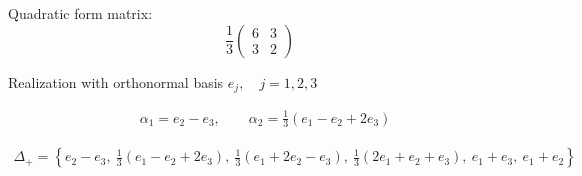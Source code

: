 \documentclass[12pt]{article}
\begin{document}
Quadratic form matrix:
\[\frac{1}{3}
\left(
\begin{array}{cc}
 6& 3 \\
 3& 2
\end{array}
\right)
\]

Realization with orthonormal basis $e_j,\quad j=1,2,3$

\begin{align*}
  &\alpha_1=e_2-e_3,\qquad 
  \alpha_2=\frac13(e_1-e_2+2e_3)
\end{align*}

\begin{align*}
 \Delta_{+}=\left\{e_2-e_3,\ \frac13(e_1-e_2+2e_3),\ \frac13(e_1+2e_2-e_3),\ 
   \frac13(2e_1+e_2+e_3),\ e_1+e_3,\ e_1+e_2
  \right\}
\end{align*}
\end{document}
